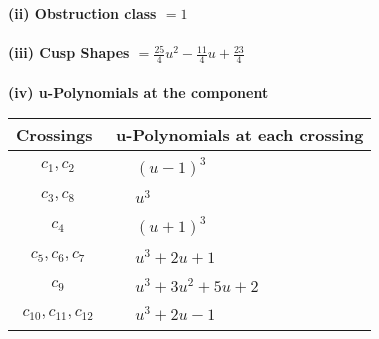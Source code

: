\documentclass[1p]{elsarticle_modified}
\theoremstyle{definition}
\begin{document}
\flushleft \textbf{(ii) Obstruction class $= 1$}\\~\\
\flushleft \textbf{(iii) Cusp Shapes $= \frac{25}{4} u^2-\frac{11}{4} u+\frac{23}{4}$}\\~\\
\newpage\renewcommand{\arraystretch}{1}
\flushleft \textbf{(iv) u-Polynomials at the component}\newline \\
\begin{tabular}{m{50pt}|m{274pt}}
Crossings & \hspace{64pt}u-Polynomials at each crossing \\
\hline $$\begin{aligned}c_{1},c_{2}\end{aligned}$$&$\begin{aligned}
&(u-1)^3
\end{aligned}$\\
\hline $$\begin{aligned}c_{3},c_{8}\end{aligned}$$&$\begin{aligned}
&u^3
\end{aligned}$\\
\hline $$\begin{aligned}c_{4}\end{aligned}$$&$\begin{aligned}
&(u+1)^3
\end{aligned}$\\
\hline $$\begin{aligned}c_{5},c_{6},c_{7}\end{aligned}$$&$\begin{aligned}
&u^3+2 u+1
\end{aligned}$\\
\hline $$\begin{aligned}c_{9}\end{aligned}$$&$\begin{aligned}
&u^3+3 u^2+5 u+2
\end{aligned}$\\
\hline $$\begin{aligned}c_{10},c_{11},c_{12}\end{aligned}$$&$\begin{aligned}
&u^3+2 u-1
\end{aligned}$\\
\hline
\end{tabular}\\~\\
\end{document}
